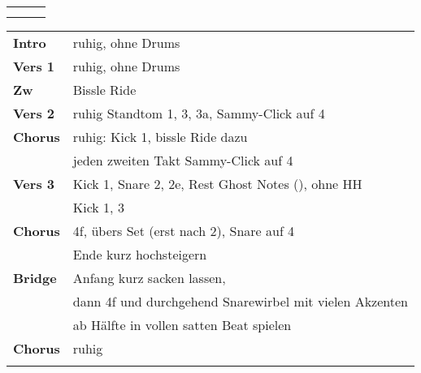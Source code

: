 

\begin{tabular}{p{0.6cm}p{12cm}p{1.4cm}}
	\rowcolor{cyan} \myRow{\thesongnumber} & \myRow{Gotteslamm} & \myRow{70} \\
	                                       &                    &            \\
\end{tabular}

\begin{tabular}{p{1.6cm}l}
	\textbf{Intro}  & ruhig, ohne Drums                                             \\
	\textbf{Vers 1} & ruhig, ohne Drums                                             \\
	\textbf{Zw}     & Bissle Ride                                                   \\
	\textbf{Vers 2} & ruhig Standtom 1, 3, 3a, Sammy-Click auf 4                    \\
	\textbf{Chorus} & ruhig: Kick 1, bissle Ride dazu                               \\
	                & jeden zweiten Takt Sammy-Click auf 4                          \\
	\textbf{Vers 3} & Kick 1, Snare 2, 2e, Rest Ghost Notes (\sechzehntel), ohne HH \\
	                & Kick 1, 3                                                     \\
	\textbf{Chorus} & 4f, übers Set (erst nach 2), Snare auf 4                      \\
	                & Ende kurz \achtel hochsteigern                                \\
	\textbf{Bridge} & Anfang kurz sacken lassen,                                    \\ %
	                & dann 4f und durchgehend Snarewirbel mit vielen Akzenten       \\ %
	                & ab Hälfte in vollen satten Beat spielen                       \\ %
	\textbf{Chorus} & ruhig                                                         \\ %
	                &                                                               \\
\end{tabular}
